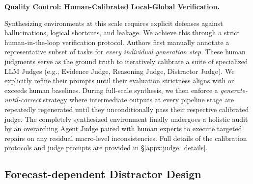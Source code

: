 \documentclass[]{servicenow}
\newcommand{\paragraphtight}[1]{%
  \par\vspace{-0.75\parskip}\vspace{0.3em}%
  \noindent\textbf{#1}\hspace{0.4em}\ignorespaces
}
\begin{document}
\paragraphtight{Quality Control: Human-Calibrated Local-Global Verification.}
Synthesizing environments at this scale requires explicit defenses against hallucinations, logical shortcuts, and leakage. 
We achieve this through a strict human-in-the-loop verification protocol. 
Authors first manually annotate a representative subset of tasks for \emph{every individual generation step}. These human judgments serve as the ground truth to iteratively calibrate a suite of specialized LLM Judges (e.g., Evidence Judge, Reasoning Judge, Distractor Judge). We explicitly refine their prompts until their evaluation strictness aligns with or exceeds human baselines. During full-scale synthesis, we then enforce a \emph{generate-until-correct} strategy where intermediate outputs at every pipeline stage are repeatedly regenerated until they unconditionally pass their respective calibrated judge. The completely synthesized environment finally undergoes a holistic audit by an overarching Agent Judge paired with human experts to execute targeted repairs on any residual macro-level inconsistencies. Full details of the calibration protocols and judge prompts are provided in \S\ref{appx:judge_details}.





\subsection{Forecast-dependent Distractor Design}
\label{sec:distractor_taxonomy}
\end{document}
